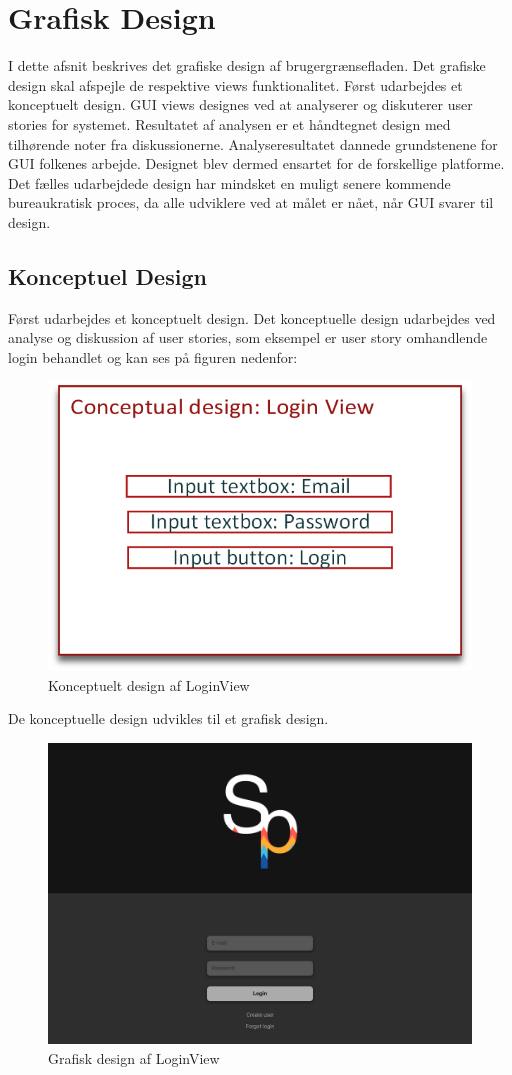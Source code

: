 \section{Grafisk Design}
I dette afsnit beskrives det grafiske design af brugergrænsefladen. Det grafiske design skal afspejle de respektive views funktionalitet. Først udarbejdes et konceptuelt design. GUI views designes ved at analyserer og diskuterer user stories for systemet. Resultatet af analysen er et håndtegnet design med tilhørende noter fra diskussionerne. Analyseresultatet dannede grundstenene for GUI folkenes arbejde. Designet blev dermed ensartet for de forskellige platforme. Det fælles udarbejdede design har mindsket en muligt senere kommende bureaukratisk proces, da alle udviklere ved at målet er nået, når GUI svarer til design. 

\subsection{Konceptuel Design}
Først udarbejdes et konceptuelt design. Det konceptuelle design udarbejdes ved analyse og diskussion af user stories, som eksempel er user story omhandlende login behandlet og kan ses på figuren nedenfor:

\begin{figure}
	\centering
	\includegraphics[width=0.5\linewidth]{figs/design/concuptuel_design_loginview}
	\caption{Konceptuelt design af LoginView}
	\label{fig:conceptualdesignview}
\end{figure}

De konceptuelle design udvikles til et grafisk design.

\begin{figure}
	\centering
	\includegraphics[width=0.5\linewidth]{figs/design/DesktopHDLogin}
	\caption{Grafisk design af LoginView}
	\label{fig:graphicaldesign}
\end{figure}